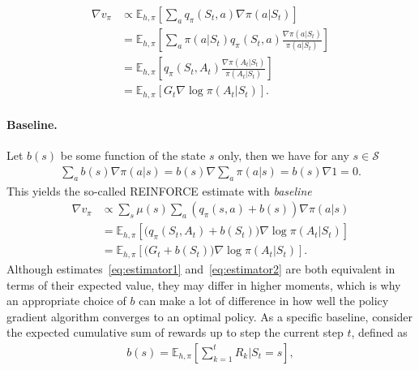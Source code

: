 \documentclass[a4paper]{report}
\theoremstyle{definition}
\theoremstyle{plain}
\begin{document}
\begin{subequations}
\begin{align}
  \nabla v_{\pi} &\propto \mathbb{E}_{h, \pi} \left[ \sum_{a} q_{\pi}(S_{t}, a) \nabla\pi(a | S_{t}) \right] \\
  &= \mathbb{E}_{h, \pi} \left[ \sum_{a} \pi(a | S_{t}) q_{\pi}(S_{t}, a) \frac{\nabla \pi(a | S_{t})}{\pi(a | S_{t})} \right] \\
  &= \mathbb{E}_{h, \pi} \left[ q_{\pi}(S_{t}, A_{t}) \frac{\nabla \pi(A_{t} | S_{t})}{\pi(A_{t}| S_{t})} \right] \\
  &= \mathbb{E}_{h, \pi} \left[ G_{t} \nabla \log \pi(A_{t} | S_{t}) \right] .
  \label{eq:estimator1}
\end{align}
\end{subequations}

\paragraph{Baseline.}
Let $b(s)$ be some function of the state $s$ only, then we have for any $s \in \mathcal{S}$
\begin{align}
  \sum_{a} b(s) \nabla \pi(a | s) = b(s) \nabla \sum_{a} \pi(a | s) = b(s) \nabla 1 = 0 .
\end{align}
This yields the so-called REINFORCE estimate with \textit{baseline}
\begin{subequations}
\begin{align}
  \nabla v_{\pi} &\propto \sum_{s} \mu(s) \sum_{a} (q_{\pi}(s, a) + b(s)) \nabla \pi(a | s) \\
          &= \mathbb{E}_{h, \pi} \left[ \bigl(q_{\pi}(S_{t}, A_{t}) + b(S_{t}) \bigr) \nabla \log \pi(A_{t} | S_{t}) \right] \\
  &= \mathbb{E}_{h, \pi} \left[ \bigl(G_{t} + b(S_{t}) \bigr) \nabla \log \pi(A_{t} | S_{t}) \right] .
  \label{eq:estimator2}
\end{align}
\end{subequations}
%
Although estimates~\eqref{eq:estimator1} and~\eqref{eq:estimator2} are both equivalent in terms of their expected
value, they may differ in higher moments, which is why an appropriate choice of
$b$ can make a lot of difference in how well the policy gradient algorithm
converges to an optimal policy.
%
As a specific baseline, consider the expected cumulative sum of rewards up to
step the current step $t$, defined as
\begin{align}
  b(s) = \mathbb{E}_{h,\pi} \left[ \sum_{k=1}^{t} R_{k} \Big| S_{t} = s \right],
\end{align}
\end{document}

